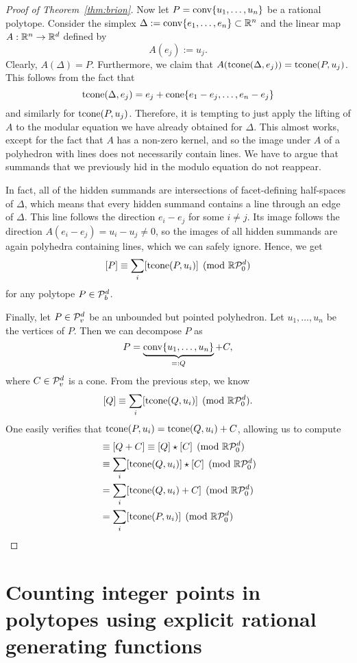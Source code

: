 \begin{proof}[Proof of Theorem~\ref{thm:brion}]
  Now let $P = \operatorname{conv}\{ u_1, \ldots, u_n \}$ be a rational polytope.
  Consider the simplex $\Delta := \operatorname{conv}\{ e_1, \ldots, e_n \} \subset \mathbb{R}^n$
  and the linear map $A: \mathbb{R}^n \to \mathbb{R}^d$ defined by
  \[
    A(e_j) := u_j.
  \]
  Clearly, $A(\Delta) = P$.
  Furthermore, we claim that $A(\operatorname{tcone}(\Delta, e_j)) = \operatorname{tcone}(P, u_j)$.
  This follows from the fact that
  \[
    \operatorname{tcone}(\Delta, e_j) = e_j + \operatorname{cone}\{ e_1 - e_j,  \ldots, e_n - e_j \}
  \]
  and similarly for $\operatorname{tcone}(P, u_j)$.
  Therefore, it is tempting to just apply the lifting of $A$ to the modular equation we have already obtained for $\Delta$.
  This almost works, except for the fact that $A$ has a non-zero kernel,
  and so the image under $A$ of a polyhedron with lines does not necessarily contain lines.
  We have to argue that summands that we previously hid in the modulo equation do not reappear.

  In fact, all of the hidden summands are intersections of facet-defining half-spaces of $\Delta$,
  which means that every hidden summand contains a line through an edge of $\Delta$.
  This line follows the direction $e_i - e_j$ for some $i \neq j$.
  Its image follows the direction $A(e_i - e_j) = u_i - u_j \neq 0$,
  so the images of all hidden summands are again polyhedra containing lines,
  which we can safely ignore.
  Hence, we get
  \[
    [P] \equiv \sum_i [\operatorname{tcone}(P, u_i)] \pmod{\mathbb{R}\mathcal{P}_0^d}
  \]
  for any polytope $P \in \mathcal{P}_b^d$.

  Finally, let $P \in \mathcal{P}_v^d$ be an unbounded but pointed polyhedron.
  Let $u_1, \ldots, u_n$ be the vertices of $P$.
  Then we can decompose $P$ as
  \[
    P = \underbrace{\operatorname{conv}\{ u_1, \ldots, u_n \}}_{=: Q} + C,
  \]
  where $C \in \mathcal{P}_v^d$ is a cone.
  From the previous step, we know
  \[
    [Q] \equiv \sum_i [\operatorname{tcone}(Q, u_i)] \pmod{\mathbb{R}\mathcal{P}_0^d}.
  \]
  One easily verifies that $\operatorname{tcone}(P, u_i) = \operatorname{tcone}(Q, u_i) + C$, allowing us to compute
  \begin{align*}
    [P]
    &\equiv [Q + C] \equiv [Q] \star [C] \pmod{\R\cP_0^d} \\
    &\equiv \sum_i [\tcone(Q, u_i)] \star [C] \pmod{\R\cP_0^d} \\
    &= \sum_i [\tcone(Q, u_i) + C] \pmod{\R\cP_0^d} \\
    &= \sum_i [\tcone(P, u_i)] \pmod{\R\cP_0^d} \qedhere
  \end{align*}
\end{proof}






\section{Counting integer points in polytopes using explicit rational generating functions}


